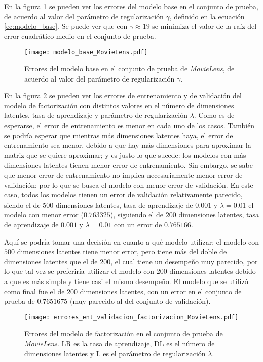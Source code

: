En la figura \ref{fig:ML_modelo_base_errores} se pueden ver los errores del modelo base en el conjunto de prueba, de acuerdo al valor del parámetro de regularización $\gamma$, definido en la ecuación \ref{ec:modelo_base}. Se puede ver que con $\gamma \approx 19$ se minimiza el valor de la raíz del error cuadrático medio en el conjunto de prueba.

\begin{figure}[H]
	\centering
 	\texttt{[image: modelo\_base\_MovieLens.pdf]}
 	\caption{Errores del modelo base en el conjunto de prueba de \textit{MovieLens}, de acuerdo al valor del parámetro de regularización $\gamma$.}
 	\label{fig:ML_modelo_base_errores}
\end{figure}

En la figura \ref{fig:ML_modelo_fact_errores} se pueden ver los errores de entrenamiento y de validación del modelo de factorización con distintos valores en el número de dimensiones latentes, tasa de aprendizaje y parámetro de regularización $\lambda$. Como es de esperarse, el error de entrenamiento es menor en cada uno de los casos. También se podría esperar que mientras más dimensiones latentes haya, el error de entrenamiento sea menor, debido a que hay más dimensiones para aproximar la matriz que se quiere aproximar; y es justo lo que sucede: los modelos con más dimensiones latentes tienen menor error de entrenamiento. Sin embargo, se sabe que menor error de entrenamiento no implica necesariamente menor error de validación; por lo que se busca el modelo con menor error de validación. En este caso, todos los modelos tienen un error de validación relativamente parecido, siendo el de $500$ dimensiones latentes, tasa de aprendizaje de $0.001$ y $\lambda = 0.01$ el modelo con menor error ($0.763325$), siguiendo el de $200$ dimensiones latentes, tasa de aprendizaje de $0.001$ y $\lambda = 0.01$ con un error de $0.765166$. 

Aquí se podría tomar una decisión en cuanto a qué modelo utilizar: el modelo con $500$ dimensiones latentes tiene menor error, pero tiene más del doble de dimensiones latentes que el de $200$, el cual tiene un desempeño muy parecido, por lo que tal vez se preferiría utilizar el modelo con $200$ dimensiones latentes debido a que es más simple y tiene casi el mismo desempeño. El modelo que se utilizó como final fue el de $200$ dimensiones latentes, con un error en el conjunto de prueba de $0.7651675$ (muy parecido al del conjunto de validación).

\begin{figure}[H]
	\centering
 	\texttt{[image: errores\_ent\_validacion\_factorizacion\_MovieLens.pdf]}
 	\caption{Errores del modelo de factorización en el conjunto de prueba de \textit{MovieLens}. LR es la tasa de aprendizaje, DL es el número de dimensiones latentes y L es el parámetro de regularización $\lambda$.}
 	\label{fig:ML_modelo_fact_errores}
\end{figure}

